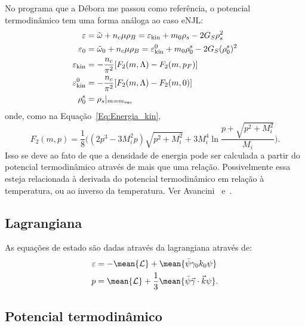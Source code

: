 No programa que a Débora me passou como referência, o potencial termodinâmico tem uma forma análoga ao caso eNJL:
\begin{subequations}\label{Eq:Pot_termodinamico_2}
\begin{align}
	\varepsilon &= \tilde{\omega} + n_c\mu\rho_B = \varepsilon_{\rm{kin}} + m_0\rho_s - 2G_S\rho_s^2 \\
	\varepsilon_0 &= \tilde{\omega}_0 + n_c\mu\rho_B = \varepsilon_{\rm{kin}}^0 + m_0\rho_0^s - 2G_S(\rho_0^s)^2 \\
	\varepsilon_{\rm{kin}} &= -\frac{n_c}{\pi^2} [F_2(m, \Lambda) - F_2(m, p_F)] \\
	\varepsilon_{\rm{kin}}^0 &= -\frac{n_c}{\pi^2} [F_2(m, \Lambda) - F_2(m, 0)] \\
	\rho_0^s &= \rho_s|_{m = m_{\rm{vac}}}
\end{align}
\end{subequations}
%
onde, como na Equação~\eqref{Eq:Energia_kin},
\begin{equation}
	F_2(m, p) = \frac{1}{8}\Big((2p^3 - 3M_i^2p)\sqrt{p^2 + M_i^2} + 3M_i^4\ln\frac{p + \sqrt{p^2 + M_i^2}}{M_i}\Big).
\end{equation}
%
Isso se deve ao fato de que a densidade de energia pode ser calculada a partir do potencial termodinâmico através de mais que uma relação. Possivelmente essa esteja relacionada à derivada do potencial termodinâmico em relação à temperatura, ou ao inverso da temperatura. Ver Avancini~\cite{Avancini2004} e~\cite{Avancini2006}.

\subsection{Lagrangiana}

As equações de estado são dadas através da lagrangiana através de\cite{Glendenning1983}:
\begin{align}
	\varepsilon &= -\mean{\mathcal{L}} + \mean{\bar\psi\gamma_0k_0\psi} \\
	p &= \mean{\mathcal{L}} + \frac{1}{3} \mean{\bar\psi\vec{\gamma}\cdot\vec{k}\psi}.
\end{align}

\subsection{Potencial termodinâmico}

